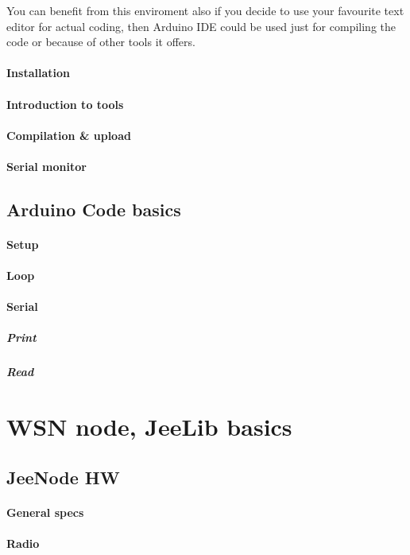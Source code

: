 \documentclass[12pt,titlepage]{article}
\begin{document}
	You can benefit from this enviroment also if you decide to use your favourite text editor for actual coding, then Arduino IDE could be used just for compiling the code or because of other tools it offers. 
		\paragraph{Installation}
		\paragraph{Introduction to tools}
		\paragraph{Compilation \& upload}
		\paragraph{Serial monitor}

	\subsection{Arduino Code basics}
		\paragraph{Setup}
		\paragraph{Loop}
		\paragraph{Serial}
			\subparagraph{Print}
			\subparagraph{Read}

\section{WSN node, JeeLib basics}

	\subsection{JeeNode HW }
		\paragraph{General specs}
		\paragraph{Radio}
\end{document}
